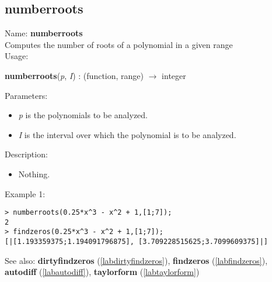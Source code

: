 \subsection{numberroots}
\label{labnumberroots}
\noindent Name: \textbf{numberroots}\\
Computes the number of roots of a polynomial in a given range\\
\noindent Usage: 
\begin{center}
\textbf{numberroots}(\emph{p}, \emph{I}) : (\textsf{function}, \textsf{range}) $\rightarrow$ \textsf{integer}\\
\end{center}
Parameters: 
\begin{itemize}
\item \emph{p} is the polynomials to be analyzed.
\item \emph{I} is the interval over which the polynomial is to be analyzed.
\end{itemize}
\noindent Description: \begin{itemize}

\item Nothing.
\end{itemize}
\noindent Example 1: 
\begin{center}\begin{minipage}{15cm}\begin{Verbatim}[frame=single]
> numberroots(0.25*x^3 - x^2 + 1,[1;7]);
2
> findzeros(0.25*x^3 - x^2 + 1,[1;7]);
[|[1.193359375;1.194091796875], [3.709228515625;3.7099609375]|]
\end{Verbatim}
\end{minipage}\end{center}
See also: \textbf{dirtyfindzeros} (\ref{labdirtyfindzeros}), \textbf{findzeros} (\ref{labfindzeros}), \textbf{autodiff} (\ref{labautodiff}), \textbf{taylorform} (\ref{labtaylorform})
